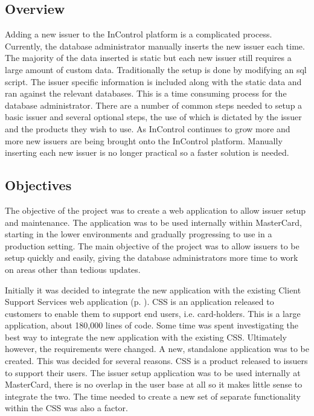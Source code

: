 \documentclass[a4paper, 11pt, titlepage]{article}
\begin{document}
\subsection{Overview} 
Adding a new issuer to the InControl platform is a complicated process. Currently, the database administrator manually inserts the new issuer each time. The majority of the data inserted is static but each new issuer still requires a large amount of custom data. Traditionally the setup is done by modifying an sql script. The issuer specific information is included along with the static data and ran against the relevant databases. This is a time consuming process for the database administrator. There are a number of common steps needed to setup a basic issuer and several optional steps, the use of which is dictated by the issuer and the products they wish to use. As InControl continues to grow more and more new issuers are being brought onto the InControl platform. Manually inserting each new issuer is no longer practical so a faster solution is needed. 
 
  
 
\subsection{Objectives} 
 
The objective of the project was to create a web application to allow issuer setup and maintenance. The application was to be used internally within MasterCard, starting in the lower environments and gradually progressing to use in a production setting. The main objective of the project was to allow issuers to be setup quickly and easily, giving the database administrators more time to work on areas other than tedious updates. 
 
Initially it was decided to integrate the new application with the existing Client Support Services web application (p. \pageref{CSS}). CSS is an application released to customers to enable them to support end users, i.e. card-holders. This is a large application, about 180,000 lines of code. Some time was spent investigating the best way to integrate the new application with the existing CSS. Ultimately however, the requirements were changed. A new, standalone application was to be created. This was decided for several reasons. CSS is a product released to issuers to support their users. The issuer setup application was to be used internally at MasterCard, there is no overlap in the user base at all so it makes little sense to integrate the two. The time needed to create a new set of separate functionality within the CSS was also a factor. 
 
\end{document}
